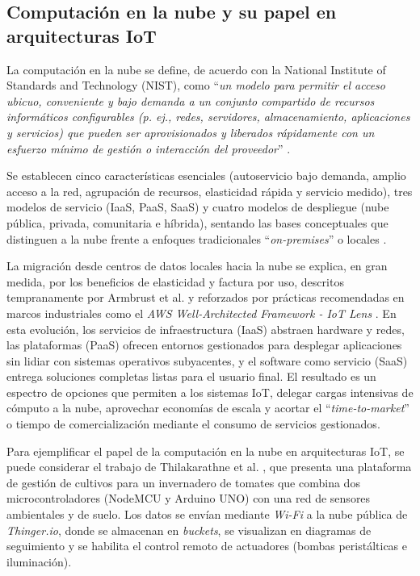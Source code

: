 \subsection{Computación en la nube y su papel en arquitecturas IoT}

La computación en la nube se define, de acuerdo con la National Institute of Standards and Technology (NIST), como ``\textit{un modelo para permitir el acceso ubicuo, conveniente y bajo demanda a un conjunto compartido de recursos informáticos configurables (p. ej., redes, servidores, almacenamiento, aplicaciones y servicios) que pueden ser aprovisionados y liberados rápidamente con un esfuerzo mínimo de gestión o interacción del proveedor}'' \cite{nist_2011}. 

Se establecen cinco características esenciales (autoservicio bajo demanda, amplio acceso a la red, agrupación de recursos, elasticidad rápida y servicio medido), tres modelos de servicio (IaaS, PaaS, SaaS) y cuatro modelos de despliegue (nube pública, privada, comunitaria e híbrida), sentando las bases conceptuales que distinguen a la nube frente a enfoques tradicionales ``\textit{on-premises}'' o locales \cite{nist_2011}.

La migración desde centros de datos locales hacia la nube se explica, en gran medida, por los beneficios de elasticidad y factura por uso, descritos tempranamente por Armbrust et al. \cite{armbrust_2010} y reforzados por prácticas recomendadas en marcos industriales como el \textit{AWS Well-Architected Framework - IoT Lens} \cite{aws_2024}. En esta evolución, los servicios de infraestructura (IaaS) abstraen hardware y redes, las plataformas (PaaS) ofrecen entornos gestionados para desplegar aplicaciones sin lidiar con sistemas operativos subyacentes, y el software como servicio (SaaS) entrega soluciones completas listas para el usuario final. El resultado es un espectro de opciones que permiten a los sistemas IoT, delegar cargas intensivas de cómputo a la nube, aprovechar economías de escala y acortar el ``\textit{time-to-market}'' o tiempo de comercialización mediante el consumo de servicios gestionados.

Para ejemplificar el papel de la computación en la nube en arquitecturas IoT, se puede considerar el trabajo de Thilakarathne et al. \cite{thilakarathne_2023}, que presenta una plataforma de gestión de cultivos para un invernadero de tomates que combina dos microcontroladores (NodeMCU y Arduino UNO) con una red de sensores ambientales y de suelo.  Los datos se envían mediante \textit{Wi-Fi} a la nube pública de \textit{Thinger.io}, donde se almacenan en \textit{buckets}, se visualizan en diagramas de seguimiento y se habilita el control remoto de actuadores (bombas peristálticas e iluminación).

